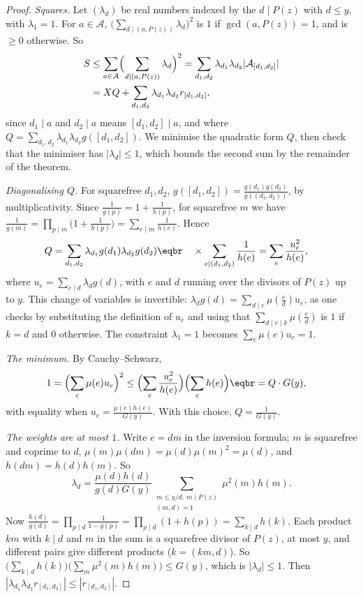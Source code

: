 \begin{proof}
\emph{Squares.} Let $(\lambda_d)$ be real numbers indexed by the $d\mid P(z)$ with $d\le y$, with $\lambda_1=1$. For $a\in\mathcal A$, $\bigl(\sum_{d\mid(a,P(z))}\lambda_d\bigr)^2$ is $1$ if $\gcd(a,P(z))=1$, and is $\ge0$ otherwise. So
\[
\begin{aligned}S&\le\sum_{a\in\mathcal A}\Bigl(\sum_{d\mid(a,P(z))}\lambda_d\Bigr)^2=\sum_{d_1,d_2}\lambda_{d_1}\lambda_{d_2}|\mathcal A_{[d_1,d_2]}|\\&=XQ+\sum_{d_1,d_2}\lambda_{d_1}\lambda_{d_2}r_{[d_1,d_2]},\end{aligned}
\]
since $d_1\mid a$ and $d_2\mid a$ means $[d_1,d_2]\mid a$, and where $Q=\sum_{d_1,d_2}\lambda_{d_1}\lambda_{d_2}g([d_1,d_2])$. We minimise the quadratic form $Q$, then check that the minimiser has $|\lambda_d|\le1$, which bounds the
second sum by the remainder of the theorem.

\emph{Diagonalising $Q$.} For squarefree $d_1,d_2$, $g([d_1,d_2])=\frac{g(d_1)g(d_2)}{g((d_1,d_2))}$, by multiplicativity. Since $\frac1{g(p)}=1+\frac1{h(p)}$, for squarefree $m$ we have $\frac1{g(m)}=\prod_{p\mid m}\bigl(1+\frac1{h(p)}\bigr)=\sum_{e\mid m}\frac1{h(e)}$.
Hence
\[
\begin{aligned}Q&=\sum_{d_1,d_2}\lambda_{d_1}g(d_1)\lambda_{d_2}g(d_2)\eqbr\quad\times\sum_{e\mid(d_1,d_2)}\frac1{h(e)}=\sum_e\frac{u_e^2}{h(e)},\end{aligned}
\]
where $u_e=\sum_{e\mid d}\lambda_dg(d)$, with $e$ and $d$ running over the divisors of $P(z)$ up to $y$. This change of variables is invertible: $\lambda_dg(d)=\sum_{d\mid e}\mu(\frac ed)u_e$, as one checks by substituting the definition of $u_e$ and using that $\sum_{d\mid e\mid k}\mu(\frac ed)$ is $1$ if $k=d$ and $0$ otherwise. The
constraint $\lambda_1=1$ becomes $\sum_e\mu(e)u_e=1$.

\emph{The minimum.} By Cauchy--Schwarz,
\[
\begin{aligned}1=\Bigl(\sum_e\mu(e)u_e\Bigr)^2&\le\Bigl(\sum_e\frac{u_e^2}{h(e)}\Bigr)\Bigl(\sum_eh(e)\Bigr)\eqbr=Q\cdot G(y),\end{aligned}
\]
with equality when $u_e=\frac{\mu(e)h(e)}{G(y)}$. With this choice, $Q=\frac1{G(y)}$.

\emph{The weights are at most $1$.} Write $e=dm$ in the inversion formula; $m$ is squarefree and coprime to $d$, $\mu(m)\mu(dm)=\mu(d)\mu(m)^2=\mu(d)$, and $h(dm)=h(d)h(m)$. So
\[
\lambda_d=\frac{\mu(d)h(d)}{g(d)G(y)}\sum_{\substack{m\le y/d,\ m\mid P(z)\\(m,d)=1}}\mu^2(m)h(m).
\]
Now $\frac{h(d)}{g(d)}=\prod_{p\mid d}\frac1{1-g(p)}=\prod_{p\mid d}(1+h(p))=\sum_{k\mid d}h(k)$. Each product $km$ with $k\mid d$ and $m$ in the sum is a squarefree divisor of $P(z)$, at most $y$, and different pairs give
different products ($k=(km,d)$). So $\bigl(\sum_{k\mid d}h(k)\bigr)\bigl(\sum_m\mu^2(m)h(m)\bigr)\le G(y)$, which is $|\lambda_d|\le1$. Then $|\lambda_{d_1}\lambda_{d_2}r_{[d_1,d_2]}|\le|r_{[d_1,d_2]}|$.
\end{proof}

